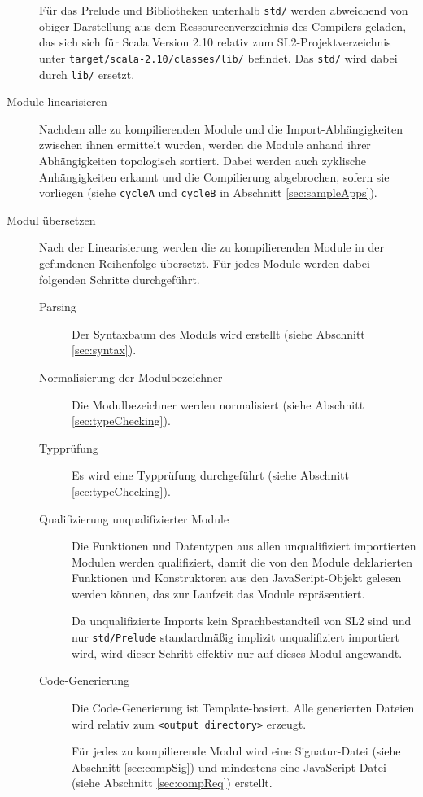 \documentclass[runningheads]{llncs}
\begin{document}
\begin{description}
    Für das Prelude und Bibliotheken unterhalb \texttt{std/} werden
    abweichend von obiger Darstellung aus dem Ressourcenverzeichnis
    des Compilers geladen, das sich sich für Scala Version 2.10
    relativ zum SL2-Projektverzeichnis unter \texttt{target/scala-2.10/classes/lib/}
    befindet. Das \texttt{std/} wird dabei durch \texttt{lib/} ersetzt.
\item[Module linearisieren] Nachdem alle zu kompilierenden Module und
    die Import-Abhängigkeiten zwischen ihnen ermittelt wurden, werden
    die Module anhand ihrer Abhängigkeiten topologisch sortiert. Dabei
    werden auch zyklische Anhängigkeiten erkannt und die Compilierung
    abgebrochen, sofern sie vorliegen (siehe \texttt{cycleA} und
    \texttt{cycleB} in Abschnitt \ref{sec:sampleApps}).
\item[Modul übersetzen] Nach der Linearisierung werden die zu
    kompilierenden Module in der gefundenen Reihenfolge übersetzt. Für
    jedes Module werden dabei folgenden Schritte durchgeführt.
    \begin{description}
    \item[Parsing] Der Syntaxbaum des Moduls wird erstellt (siehe
        Abschnitt \ref{sec:syntax}).
    \item[Normalisierung der Modulbezeichner] Die Modulbezeichner
        werden normalisiert (siehe Abschnitt \ref{sec:typeChecking}).
    \item[Typprüfung] Es wird eine Typprüfung durchgeführt (siehe
        Abschnitt \ref{sec:typeChecking}).
    \item[Qualifizierung unqualifizierter Module] Die Funktionen und
        Datentypen aus allen unqualifiziert importierten Modulen werden
        qualifiziert, damit die von den Module deklarierten Funktionen
        und Konstruktoren aus den JavaScript-Objekt gelesen werden können,
        das zur Laufzeit das Module repräsentiert.

        Da unqualifizierte Imports kein Sprachbestandteil von SL2 sind
        und nur \texttt{std/Prelude} standardmäßig implizit
        unqualifiziert importiert wird, wird dieser Schritt effektiv
        nur auf dieses Modul angewandt.
    \item[Code-Generierung] Die Code-Generierung ist Template-basiert.
        Alle generierten Dateien wird relativ zum \texttt{<output
        directory>} erzeugt.
        
        Für jedes zu kompilierende Modul wird eine Signatur-Datei
        (siehe Abschnitt \ref{sec:compSig}) und mindestens
        eine JavaScript-Datei (siehe Abschnitt \ref{sec:compReq})
        erstellt.
        

\end{description}
\end{description}
\end{document}
